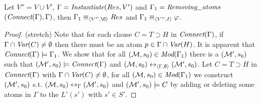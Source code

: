 \documentclass{article}
\begin{document}
\begin{proposition}\label{pro:elm}
Let $V''=V \cup V'$, $\Gamma=\emph{Instantiate}(Res, V')$ and $\Gamma_1=\emph{Removing\_atoms}$ $(\emph{Connect}(\Gamma), \Gamma)$, then  $\Gamma_1\equiv_{\tuple{V'', {\O}}} Res$ and $\Gamma_1 \equiv_{{\langle{V'', I}\rangle}} \varphi$.
\end{proposition}
\begin{proof}(stretch)
Note that for each clause $C = T \supset H$ in $\emph{Connect}(\Gamma)$, if $\Gamma \cap \textit{Var}(C) \neq \emptyset$ then there must be an atom $p\in \Gamma \cap \textit{Var}(H)$. It is apparent that $\emph{Connect}(\Gamma) \models \Gamma_1$. We  show that  for all $({\cal M}, s_0) \in \textit{Mod}(\Gamma_1)$ there is a $({\cal M}', s_0)$ such that $({\cal M}', s_0) \models \emph{Connect}(\Gamma)$ and $({\cal M}, s_0) \leftrightarrow_{{\langle{\Gamma, \emptyset}\rangle}} ({\cal M}', s_0)$.
Let $C = T \supset H$ in $\emph{Connect}(\Gamma)$ with $\Gamma \cap \textit{Var}(C) \neq \emptyset$,
for all $({\cal M}, s_0) \in \textit{Mod}(\Gamma_1)$ we construct $({\cal M}', s_0)$ s.t. $({\cal M},s_0) \leftrightarrow_{\Gamma} ({\cal M}', s_0)$ and $({\cal M}', s_0) \models C$ by adding or deleting some atoms in $\Gamma$ to the $L'(s')$ with $s'\in S'$.


\end{proof}
\end{document}
